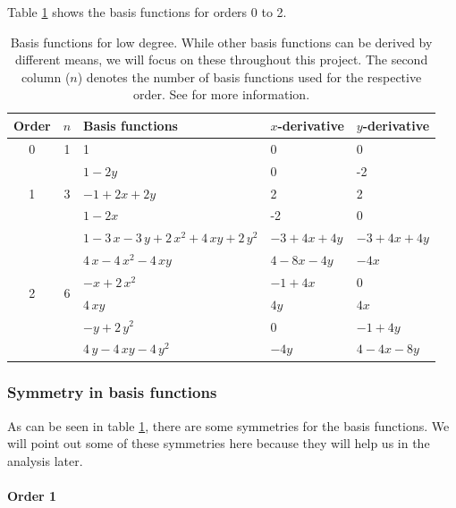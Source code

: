 \documentclass{article}
\begin{document}
Table \ref{tab:basis-functions-for-low-degrees} shows the basis functions for orders 0 to 2.

\begin{table}[ht]
  \centering
  \begin{tabular}{cclll}
    \toprule
    Order & $n$ & Basis functions & $x$-derivative & $y$-derivative \\
    \midrule
    \multirow{1}{*}{0} & 1 & 1 & 0 & 0\\
    \midrule
    \multirow{3}{*}{1} & \multirow{3}{*}{3} & $1-2y$ & 0 & -2\\
    &  & $-1+2x+2y$ & 2 & 2\\
    &  & $1-2x$ & -2 & 0\\
    \midrule
    \multirow{6}{*}{2} & \multirow{6}{*}{6} & $1-3\,x-3\,y+2\,{x}^{2}+4\,xy+2\,{y}^{2}$ & $-3+4x+4y$ & $-3+4x+4y$\\
& & $4\,x-4\,{x}^{2}-4\,xy$ & $4-8x-4y$ & $-4x$\\
& & $-x+2\,{x}^{2}$ & $-1+4x$ & 0\\
& & $4\,xy$ & $4y$ & $4x$\\
& & $-y+2\,{y}^{2}$ & $0$ & $-1+4y$\\
& & $4\,y-4\,xy-4\,{y}^{2}$ & $-4y$ & $4-4x-8y$ \\
    \bottomrule
  \end{tabular}
  \caption{Basis functions for low degree. While other basis functions can be derived by different means, we will focus on these throughout this project. The second column ($n$) denotes the number of basis functions used for the respective order. See \cite{castro07high-order-ader-fv-dg-numerical-methods,dunavant1985high} for more information.}
  \label{tab:basis-functions-for-low-degrees}
\end{table}

\subsubsection{Symmetry in basis functions}
\label{sec:basis-function-symmetry}

As can be seen in table \ref{tab:basis-functions-for-low-degrees}, there are some symmetries for the basis functions. We will point out some of these symmetries here because they will help us in the analysis later.

\paragraph{Order 1}
\end{document}
